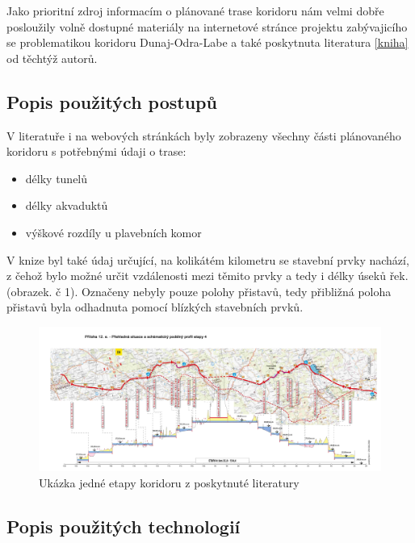 \documentclass[11pt,a4paper]{article}
\begin{document}
    Jako prioritní zdroj informacím o plánované trase koridoru 
    nám velmi dobře posloužily volně
    dostupné materiály na internetové stránce projektu zabývajicího se
    problematikou koridoru Dunaj-Odra-Labe a také poskytnuta literatura
    \ref{kniha} od těchtýž autorů.

    \subsection{Popis použitých postupů}

      V literatuře i na webových stránkách byly zobrazeny všechny části
      plánovaného koridoru s potřebnými údaji o trase:
      \begin{itemize}
        \item délky tunelů
        \item délky akvaduktů
        \item výškové rozdíly u plavebních komor
      \end{itemize}

      V knize byl také údaj určující, na kolikátém kilometru se stavební prvky
      nachází, z čehož bylo možné určit vzdálenosti mezi těmito prvky a tedy i
      délky úseků řek. (obrazek. č 1).  Označeny nebyly pouze polohy přistavů,
      tedy přibližná poloha přistavů byla odhadnuta pomocí blízkých stavebních
      prvků.

    \begin{figure}[ht!]
      \centering
      \includegraphics[width=1\textwidth, natwidth=6969, natheight=2953]
                      {etapa4.jpg}
      \caption{Ukázka jedné etapy koridoru z poskytnuté literatury
      \label{overflow}}
    \end{figure}

    \subsection{Popis použitých technologií}
\end{document}
